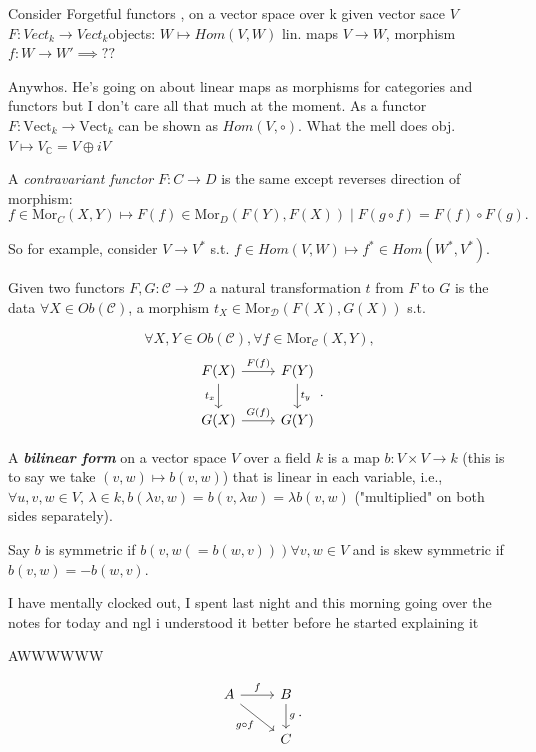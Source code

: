 \documentclass{article}
\begin{document}
Consider Forgetful functors , on a vector space over k given vector sace \( V \) \( F: Vect_k \to Vect_k \)objects: \( W \mapsto Hom(V,W) \) lin. maps \( V \to  W \), morphism \( f: W \to  W'\implies?? \)

Anywhos. He's going on about linear maps as morphisms for categories and functors but I don't care all that much at the moment. As a functor \( F : \text{Vect}_k \to  \text{Vect}_k \) can be shown as \( Hom(V, \circ) \). What the mell does obj. \( V \mapsto V_{\mathbb{C}}=V\oplus iV\)

\begin{definition}
  A \textit{contravariant functor} \( F : C \to D \) is the same except reverses direction of morphism:
  \begin{displaymath}
    f \in  \text{Mor}_C(X,Y) \mapsto F(f) \in  \text{Mor}_D(F(Y),F(X)) \mid  F(g\circ f)=F(f) \circ F(g).
  \end{displaymath}
\end{definition}

So for example, consider \( V \to V^* \) s.t. \( f \in  Hom(V,W) \mapsto f^* \in  Hom(W^*,V^*) \). 

\begin{definition}
  Given two functors \( F,G : \mathscr{C} \to  \mathscr{D} \) a natural transformation \( t \) from \( F \) to \(G\) is the data \( \forall X \in  Ob(\mathscr{C}) \), a morphism \( t_X \in  \text{Mor}_{\mathscr{D}}(F(X),G(X)) \) s.t. 

 \[
 \forall  X, Y \in  Ob(\mathscr{C}), \forall f \in  \text{Mor}_{\mathscr{C}}(X,Y), \]
 \[
\begin{tikzcd}
F(X) \arrow{r}{F(f)} \arrow[swap]{d}{t_x} & F(Y) \arrow{d}{t_y} \\%
G(X) \arrow{r}{G(f)}& G(Y)
\end{tikzcd}
.\]
  
\end{definition}

\begin{definition}
  A \textbf{\textit{bilinear form}} on a vector space \( V \) over a field \( k \) is a map \( b:V \times V \to  k \) (this is to say we take \( (v,w)\mapsto b(v,w) \)) that is linear in each variable, i.e., \( \forall u,v,w \in  V, \, \lambda \in  k, b(\lambda v,w)=b(v,\lambda w)=\lambda b(v,w) \) ("multiplied" on both sides separately). 
\end{definition}

\begin{definition}[symmetric]
  Say \( b \) is symmetric if \( b(v,w( = b(w,v) )) \forall v,w \in  V \) and is skew symmetric if \( b(v,w)=-b(w,v) \).
\end{definition}

I have mentally clocked out, I spent last night and this morning going over the notes for today and ngl i understood it better before he started explaining it 

AWWWWWW 

\[
  \begin{tikzcd}
    A \arrow{r}{f} \arrow[swap]{dr}{g\circ f} & B \arrow{d}{g} \\%
& C
\end{tikzcd}
.\] 
\end{document}
